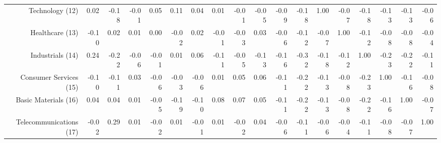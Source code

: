 \begin{sidewaystable}
{\begin{tabular}{rrrrrrrrrrrrrrrrrr}
Technology (12)         & 0.02  & -0.18 & -0.01 & 0.05  & 0.11  & 0.04  & 0.01  & -0.01 & -0.05 & -0.09 & -0.18 & 1.00  & -0.07 & -0.18 & -0.13 & -0.13 & -0.06 \\
Healthcare (13)         & -0.10 & 0.02  & 0.01  & 0.00  & -0.02 & 0.02  & -0.01 & -0.03 & 0.03  & -0.06 & -0.12 & -0.07 & 1.00  & -0.12 & -0.08 & -0.08 & -0.04 \\
Industrials (14)        & 0.24  & -0.22 & -0.06 & -0.01 & 0.01  & 0.06  & -0.11 & -0.05 & -0.13 & -0.16 & -0.32 & -0.18 & -0.12 & 1.00  & -0.23 & -0.22 & -0.11 \\
Consumer Services (15)  & -0.10 & -0.11 & 0.03  & -0.06 & -0.03 & -0.06 & 0.01  & 0.05  & 0.06  & -0.11 & -0.22 & -0.13 & -0.08 & -0.23 & 1.00  & -0.16 & -0.08 \\
Basic Materials (16)    & 0.04  & 0.04  & 0.01  & -0.05 & -0.19 & -0.10 & 0.08  & 0.07  & 0.05  & -0.11 & -0.22 & -0.13 & -0.08 & -0.22 & -0.16 & 1.00  & -0.07 \\
Telecommunications (17) & -0.02 & 0.29  & 0.01  & -0.02 & 0.01  & -0.01 & 0.01  & -0.02 & 0.04  & -0.06 & -0.11 & -0.06 & -0.04 & -0.11 & -0.08 & -0.07 & 1.00
           \\ 
   \bottomrule
\end{tabular}}
\end{sidewaystable}